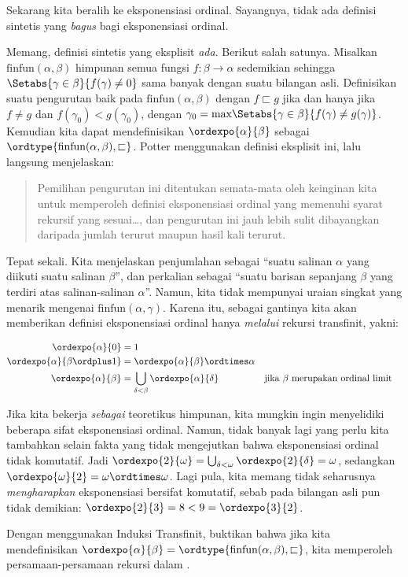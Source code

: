 \documentclass[../../../include/open-logic-section]{subfiles}
\begin{document}

Sekarang kita beralih ke eksponensiasi ordinal. Sayangnya, tidak ada definisi
sintetis yang \emph{bagus} bagi eksponensiasi ordinal.

Memang, definisi sintetis yang eksplisit \emph{ada}. Berikut salah satunya.
Misalkan $\text{finfun}(\alpha,\beta)$ himpunan semua fungsi $f \colon
\beta \to \alpha$ sedemikian sehingga $\Setabs{\gamma \in
\beta}{f(\gamma) \neq 0}$ sama banyak dengan suatu bilangan asli.
Definisikan suatu pengurutan baik pada $\text{finfun}(\alpha,\beta)$ dengan
$f \sqsubset g$ jika dan hanya jika $f \neq g$ dan $f(\gamma_0) <
g(\gamma_0)$, dengan $\gamma_0 = \text{max}\Setabs{\gamma \in
\beta}{f(\gamma) \neq g(\gamma)}$. Kemudian kita dapat mendefinisikan
$\ordexpo{\alpha}{\beta}$ sebagai $\ordtype{\text{finfun}(\alpha, \beta),
\sqsubset}$. Potter menggunakan definisi eksplisit ini, lalu langsung
menjelaskan:
\begin{quote}
	Pemilihan pengurutan ini ditentukan semata-mata oleh keinginan kita untuk
	memperoleh definisi eksponensiasi ordinal yang memenuhi syarat rekursif
	yang sesuai\ldots, dan pengurutan ini jauh lebih sulit dibayangkan daripada
	jumlah terurut maupun hasil kali terurut.
	\citep[hlm.~199]{Potter2004}
\end{quote}
Tepat sekali. Kita menjelaskan penjumlahan sebagai ``suatu salinan $\alpha$
yang diikuti suatu salinan $\beta$'', dan perkalian sebagai ``suatu barisan
sepanjang $\beta$ yang terdiri atas salinan-salinan $\alpha$''. Namun, kita
tidak mempunyai uraian singkat yang menarik mengenai
$\text{finfun}(\alpha, \gamma)$. Karena itu, sebagai gantinya kita akan
memberikan definisi eksponensiasi ordinal hanya \emph{melalui} rekursi
transfinit, yakni:

\begin{defn}
\begin{align*}
	\ordexpo{\alpha}{0} &= 1\\
	\ordexpo{\alpha}{\beta\ordplus 1} &=\ordexpo{\alpha}{\beta} \ordtimes \alpha\\
	\ordexpo{\alpha}{\beta} &= \bigcup_{\delta < \beta}\ordexpo{\alpha}{\delta}& & \text{jika $\beta$ merupakan ordinal limit}
\end{align*}
\end{defn}

Jika kita bekerja \emph{sebagai} teoretikus himpunan, kita mungkin ingin
menyelidiki beberapa sifat eksponensiasi ordinal. Namun, tidak banyak lagi
yang perlu kita tambahkan selain fakta yang tidak mengejutkan bahwa
eksponensiasi ordinal tidak komutatif. Jadi $\ordexpo{2}{\omega} =
\bigcup_{\delta < \omega}\ordexpo{2}{\delta} = \omega$, sedangkan
$\ordexpo{\omega}{2} = \omega \ordtimes \omega$. Lagi pula, kita memang
tidak seharusnya \emph{mengharapkan} eksponensiasi bersifat komutatif, sebab
pada bilangan asli pun tidak demikian: $\ordexpo{2}{3} = 8 < 9 =
\ordexpo{3}{2}$.

\begin{prob}
Dengan menggunakan Induksi Transfinit, buktikan bahwa jika kita mendefinisikan
$\ordexpo{\alpha}{\beta} = \ordtype{\text{finfun}(\alpha, \beta),
\sqsubset}$, kita memperoleh persamaan-persamaan rekursi dalam
.
\end{prob}
\end{document}
